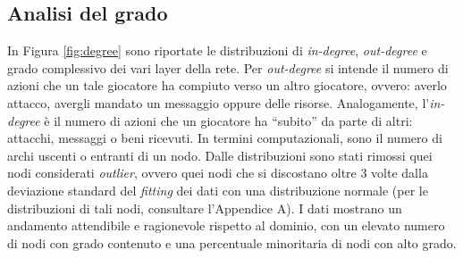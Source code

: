 \subsection{Analisi del grado}
\label{subsec:grado}
In Figura \ref{fig:degree} sono riportate le distribuzioni di \textit{in-degree}, \textit{out-degree} e grado complessivo dei vari layer della rete. Per \textit{out-degree} si intende il numero di azioni che un tale giocatore ha compiuto verso un altro giocatore, ovvero: averlo attacco, avergli mandato un messaggio oppure delle risorse. Analogamente, l'\textit{in-degree} è il numero di azioni che un giocatore ha “subito” da parte di altri: attacchi, messaggi o beni ricevuti. In termini computazionali, sono il numero di archi uscenti o entranti di un nodo. Dalle distribuzioni sono stati rimossi quei nodi considerati \textit{outlier}, ovvero quei nodi che si discostano oltre 3 volte dalla deviazione standard del \textit{fitting} dei dati con una distribuzione normale (per le distribuzioni di tali nodi, consultare l'Appendice A). I dati mostrano un andamento attendibile e ragionevole rispetto al dominio, con un elevato numero di nodi con grado contenuto e una percentuale minoritaria di nodi con alto grado.\\

